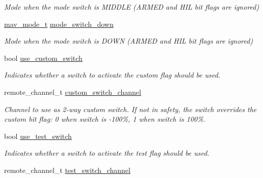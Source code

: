 \begin{DoxyCompactItemize}
\begin{DoxyCompactList}\small\item\em Mode when the mode switch is M\+I\+D\+D\+L\+E (A\+R\+M\+E\+D and H\+I\+L bit flags are ignored) \end{DoxyCompactList}\item 
\hypertarget{structremote__mode__t_a0cf09dc6ae445925338dc4d7816e298b}{\hyperlink{unionmav__mode__t}{mav\+\_\+mode\+\_\+t} \hyperlink{structremote__mode__t_a0cf09dc6ae445925338dc4d7816e298b}{mode\+\_\+switch\+\_\+down}}\label{structremote__mode__t_a0cf09dc6ae445925338dc4d7816e298b}

\begin{DoxyCompactList}\small\item\em Mode when the mode switch is D\+O\+W\+N (A\+R\+M\+E\+D and H\+I\+L bit flags are ignored) \end{DoxyCompactList}\item 
\hypertarget{structremote__mode__t_a7b0961b1a25a4994b4aa38b84b335818}{bool \hyperlink{structremote__mode__t_a7b0961b1a25a4994b4aa38b84b335818}{use\+\_\+custom\+\_\+switch}}\label{structremote__mode__t_a7b0961b1a25a4994b4aa38b84b335818}

\begin{DoxyCompactList}\small\item\em Indicates whether a switch to activate the custom flag should be used. \end{DoxyCompactList}\item 
\hypertarget{structremote__mode__t_acfe93cab2052e37871292b7aeb3c8468}{remote\+\_\+channel\+\_\+t \hyperlink{structremote__mode__t_acfe93cab2052e37871292b7aeb3c8468}{custom\+\_\+switch\+\_\+channel}}\label{structremote__mode__t_acfe93cab2052e37871292b7aeb3c8468}

\begin{DoxyCompactList}\small\item\em Channel to use as 2-\/way custom switch. If not in safety, the switch overrides the custom bit flag\+: 0 when switch is -\/100\%, 1 when switch is 100\%. \end{DoxyCompactList}\item 
\hypertarget{structremote__mode__t_a69e5478f0b8070aa255a056998187a27}{bool \hyperlink{structremote__mode__t_a69e5478f0b8070aa255a056998187a27}{use\+\_\+test\+\_\+switch}}\label{structremote__mode__t_a69e5478f0b8070aa255a056998187a27}

\begin{DoxyCompactList}\small\item\em Indicates whether a switch to activate the test flag should be used. \end{DoxyCompactList}\item 
\hypertarget{structremote__mode__t_a5a052e81982fd3711cc7168da0b81d41}{remote\+\_\+channel\+\_\+t \hyperlink{structremote__mode__t_a5a052e81982fd3711cc7168da0b81d41}{test\+\_\+switch\+\_\+channel}}\label{structremote__mode__t_a5a052e81982fd3711cc7168da0b81d41}


\end{DoxyCompactItemize}
